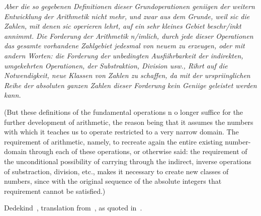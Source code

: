 \setcounter{currentlevel}{\value{baseSectionLevel}}
\label{sec:Numbers}

\epigraph{
\textsl{Aber die so gegebenen Definitionen dieser Grundoperationen
geniigen der weitern Entwicklung der Arithmetik nicht mehr, 
und zwar aus dem Grunde, weil sic
die Zahlen, mit denen sic operieren lehrt, auf ein sehr kleines 
Gebiet beschr/inkt annimmt. Die
Forderung der Arithmetik n/imlich, durch jede dieser Operationen 
das gesamte vorhandene Zahlgebiet
jedesmal von neuem zu erzeugen, oder mit andern Worten: 
die Forderung der unbedingten
Ausfiihrbarkeit der indirekten, umgekehrten Operationen, 
der Substraktion, Division usw., Rihrt
auf die Notwendigkeit, neue Klassen von Zahlen zu schaffen, 
da mit der urspriinglichen Reihe
der absoluten ganzen Zahlen 
dieser Forderung kein Geniige geleistet werden kann.}
\par
(But these definitions of the fundamental operations n
o longer suffice for the further development
of arithmetic, the reason being that it assumes the numbers with 
which it teaches us
to operate restricted to a very narrow domain. The requirement of 
arithmetic, namely, to
recreate again the entire existing number-domain through each 
of these operations, or otherwise
said: the requirement of the unconditional possibility 
of carrying through the indirect,
inverse operations of substraction, division, etc., 
makes it necessary to create new classes of
numbers, since with the original sequence 
of the absolute integers that requirement cannot be
satisfied.)}%
{Dedekind~\cite{Dedekind1854}, 
translation from~\cite{Ewald2005KantToHIlbert},
as quoted in~\cite{ferreiros2007labyrinth}.}


% 


\lstset{language=Clojure}

\label{sec:Natural-numbers}

